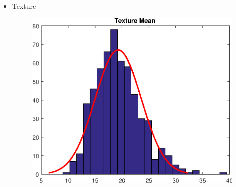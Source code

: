 \documentclass[11pt,a4paper]{article}
\numberwithin{equation}{section}
\begin{document}
\begin{itemize}
\item Texture
\begin{figure}[H]
\centering
  \includegraphics[width=.5\linewidth]{./img/texture_mean}
  \label{fig:test1}
\end{figure}%


\end{itemize}
\end{document}
